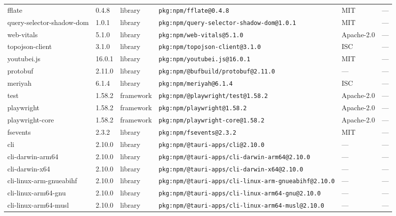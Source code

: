 \documentclass[11pt,a4paper]{article}
\begin{document}
\begin{longtable}{|p{4cm}|p{2cm}|p{1.6cm}|p{5cm}|p{1.5cm}|p{3.5cm}|}
\raggedright fflate & 0.4.8 & library & \small\texttt{pkg:npm/fflate@0.4.8} & MIT & \small — \\
\raggedright query-selector-shadow-dom & 1.0.1 & library & \small\texttt{pkg:npm/query-selector-shadow-dom@1.0.1} & MIT & \small — \\
\raggedright web-vitals & 5.1.0 & library & \small\texttt{pkg:npm/web-vitals@5.1.0} & Apache-2.0 & \small — \\
\raggedright topojson-client & 3.1.0 & library & \small\texttt{pkg:npm/topojson-client@3.1.0} & ISC & \small — \\
\raggedright youtubei.js & 16.0.1 & library & \small\texttt{pkg:npm/youtubei.js@16.0.1} & MIT & \small — \\
\raggedright protobuf & 2.11.0 & library & \small\texttt{pkg:npm/@bufbuild/protobuf@2.11.0} & — & \small — \\
\raggedright meriyah & 6.1.4 & library & \small\texttt{pkg:npm/meriyah@6.1.4} & ISC & \small — \\
\raggedright test & 1.58.2 & framework & \small\texttt{pkg:npm/@playwright/test@1.58.2} & Apache-2.0 & \small — \\
\raggedright playwright & 1.58.2 & framework & \small\texttt{pkg:npm/playwright@1.58.2} & Apache-2.0 & \small — \\
\raggedright playwright-core & 1.58.2 & framework & \small\texttt{pkg:npm/playwright-core@1.58.2} & Apache-2.0 & \small — \\
\raggedright fsevents & 2.3.2 & library & \small\texttt{pkg:npm/fsevents@2.3.2} & MIT & \small — \\
\raggedright cli & 2.10.0 & library & \small\texttt{pkg:npm/@tauri-apps/cli@2.10.0} & — & \small — \\
\raggedright cli-darwin-arm64 & 2.10.0 & library & \small\texttt{pkg:npm/@tauri-apps/cli-darwin-arm64@2.10.0} & — & \small — \\
\raggedright cli-darwin-x64 & 2.10.0 & library & \small\texttt{pkg:npm/@tauri-apps/cli-darwin-x64@2.10.0} & — & \small — \\
\raggedright cli-linux-arm-gnueabihf & 2.10.0 & library & \small\texttt{pkg:npm/@tauri-apps/cli-linux-arm-gnueabihf@2.10.0} & — & \small — \\
\raggedright cli-linux-arm64-gnu & 2.10.0 & library & \small\texttt{pkg:npm/@tauri-apps/cli-linux-arm64-gnu@2.10.0} & — & \small — \\
\raggedright cli-linux-arm64-musl & 2.10.0 & library & \small\texttt{pkg:npm/@tauri-apps/cli-linux-arm64-musl@2.10.0} & — & \small — \\

\end{longtable}
\end{document}
